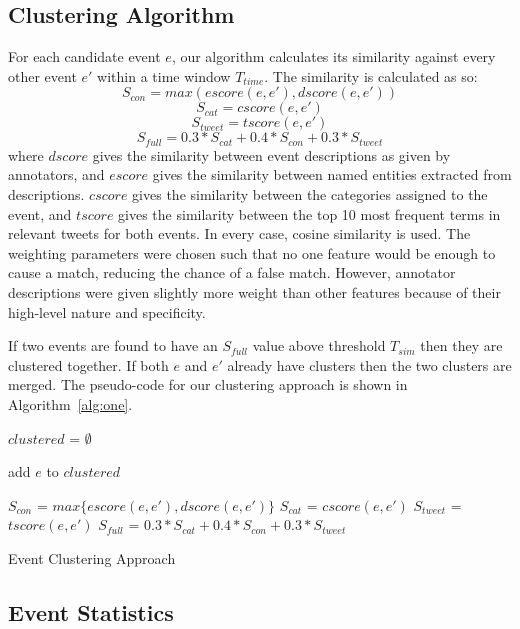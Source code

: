 \subsection{Clustering Algorithm}
\label{sec:clusteringalg}
For each candidate event \(e\), our algorithm calculates its similarity against every other event \(e'\) within a time window \(T_{time}\). The similarity is calculated as so:
\[
S_{con} = max(escore(e, e'), dscore(e, e'))
\]
\[
S_{cat} = cscore(e, e')
\]
\[
S_{tweet} = tscore(e, e')
\]
\[
S_{full} = 0.3 * S_{cat} + 0.4 * S_{con} + 0.3 * S_{tweet}
\]
where \(dscore\) gives the similarity between event descriptions as given by annotators, and \(escore\) gives the similarity between named entities extracted from descriptions. \(cscore\) gives the similarity between the categories assigned to the event, and \(tscore\) gives the similarity between the top 10 most frequent terms in relevant tweets for both events.
In every case, cosine similarity is used.
The weighting parameters were chosen such that no one feature would be enough to cause a match, reducing the chance of a false match.
However, annotator descriptions were given slightly more weight than other features because of their high-level nature and specificity.

If two events are found to have an \(S_{full}\) value above threshold \(T_{sim}\) then they are clustered together. If both \(e\) and \(e'\) already have clusters then the two clusters are merged.
The pseudo-code for our clustering approach is shown in Algorithm~\ref{alg:one}.

\begin{algorithm}
$clustered$ = $\emptyset$\;
 {
	add $e$ to $clustered$\;
	 {

		$S_{con}$ = $max\{escore(e, e'), dscore(e, e')\}$\;
		$S_{cat}$ = $cscore(e, e')$\;
		$S_{tweet}$ = $tscore(e, e')$\;
		$S_{full}$ = $0.3 * S_{cat} + 0.4 * S_{con} + 0.3 * S_{tweet}$\;
		 {
			 
		}
	}
}
\caption{Event Clustering Approach}
\label{alg:one}
\end{algorithm}

\subsection{Event Statistics}

